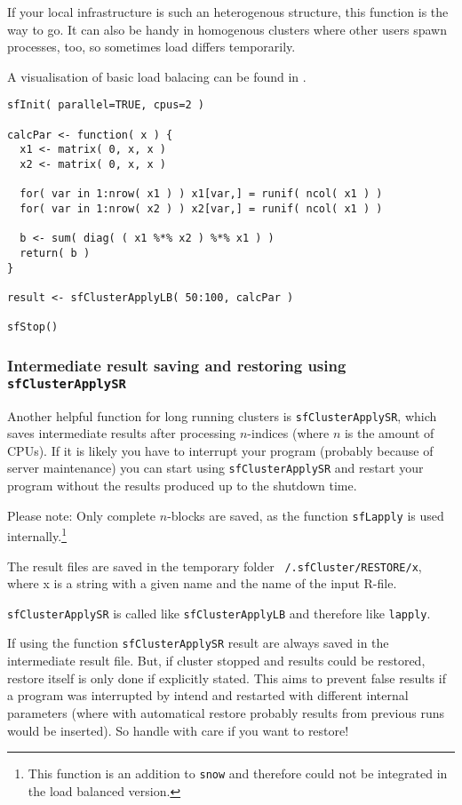 \documentclass[10pt,oneside]{article}
\begin{document}
If your local infrastructure is such an heterogenous structure, this
function is the way to go. It can also be handy in homogenous clusters
where other users spawn processes, too, so sometimes load differs
temporarily.

A visualisation of basic load balacing can be found in \cite{ROSS_07}.

\begin{verbatim}
sfInit( parallel=TRUE, cpus=2 )

calcPar <- function( x ) {
  x1 <- matrix( 0, x, x )
  x2 <- matrix( 0, x, x )

  for( var in 1:nrow( x1 ) ) x1[var,] = runif( ncol( x1 ) )
  for( var in 1:nrow( x2 ) ) x2[var,] = runif( ncol( x1 ) )

  b <- sum( diag( ( x1 %*% x2 ) %*% x1 ) )
  return( b )
}

result <- sfClusterApplyLB( 50:100, calcPar )

sfStop()
\end{verbatim}

\subsubsection{Intermediate result saving and restoring using
               \texttt{sfClusterApplySR}}
Another helpful function for long running clusters is
\texttt{sfClusterApplySR}, which saves intermediate results after
processing $n$-indices (where $n$ is the amount of CPUs). If it is likely
you have to interrupt your program (probably because of server
maintenance) you can start using \texttt{sfClusterApplySR} and restart
your program without the results produced up to the shutdown time.

Please note: Only complete $n$-blocks are saved, as the
function \texttt{sfLapply} is used internally.\footnote{This function is an addition
to \texttt{snow} and therefore could not be integrated in the load
balanced version.}

The result files are saved in the temporary folder
\texttt{~/.sfCluster/RESTORE/x}, where x is a string with a given name
and the name of the input R-file.

\texttt{sfClusterApplySR} is called like \texttt{sfClusterApplyLB} and
therefore like \texttt{lapply}.

If using the function \texttt{sfClusterApplySR} result are always saved
in the intermediate result file. But, if cluster stopped and results
could be restored, restore itself is only done if explicitly stated.
This aims to prevent false results if a program was interrupted by
intend and restarted with different internal parameters (where with
automatical restore probably results from previous runs would be
inserted). So handle with care if you want to restore!
\end{document}
